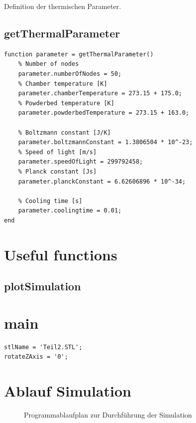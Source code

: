 \documentclass{scrartcl}
\begin{document}
Definition der thermischen Parameter.

\subsection{getThermalParameter}\label{subsec:getThermalParameter}

\begin{lstlisting}
function parameter = getThermalParameter()
    % Number of nodes
    parameter.numberOfNodes = 50;
    % Chamber temperature [K]
    parameter.chamberTemperature = 273.15 + 175.0;
    % Powderbed temperature [K]
    parameter.powderbedTemperature = 273.15 + 163.0;
    
    % Boltzmann constant [J/K]
    parameter.boltzmannConstant = 1.3806504 * 10^-23;
    % Speed of light [m/s]
    parameter.speedOfLight = 299792458;
    % Planck constant [Js]
    parameter.planckConstant = 6.62606896 * 10^-34;
    
    % Cooling time [s]
    parameter.coolingtime = 0.01;
end
\end{lstlisting}

\section{Useful functions}\label{sec:usefulFunctions}

\subsection{plotSimulation}\label{subsec:plotSimulation}

\section{main}\label{sec:main}

\begin{lstlisting}
stlName = 'Teil2.STL';
rotateZAxis = '0';
\end{lstlisting}

\section{Ablauf Simulation}

\begin{figure}
\centering
\def\svgwidth{350pt}

\caption{Programmablaufplan zur Durchführung der Simulation}
\label{fig:softwareablauf}
\end{figure}
\end{document}
